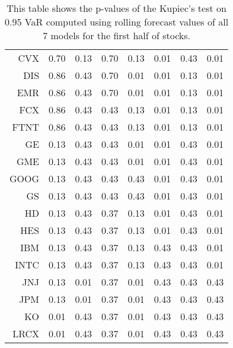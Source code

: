 \begin{table}[ht]
\begin{tabular}{rrrrrrrr}
  CVX & 0.70 & 0.13 & 0.70 & 0.13 & 0.01 & 0.43 & 0.01 \\ 
  DIS & 0.86 & 0.43 & 0.70 & 0.01 & 0.01 & 0.13 & 0.01 \\ 
  EMR & 0.86 & 0.43 & 0.70 & 0.01 & 0.01 & 0.13 & 0.01 \\ 
  FCX & 0.86 & 0.43 & 0.43 & 0.13 & 0.01 & 0.13 & 0.01 \\ 
  FTNT & 0.86 & 0.43 & 0.43 & 0.13 & 0.01 & 0.13 & 0.01 \\ 
  GE & 0.13 & 0.43 & 0.43 & 0.01 & 0.01 & 0.43 & 0.01 \\ 
  GME & 0.13 & 0.43 & 0.43 & 0.01 & 0.01 & 0.43 & 0.01 \\ 
  GOOG & 0.13 & 0.43 & 0.43 & 0.43 & 0.01 & 0.43 & 0.01 \\ 
  GS & 0.13 & 0.43 & 0.43 & 0.43 & 0.01 & 0.43 & 0.01 \\ 
  HD & 0.13 & 0.43 & 0.37 & 0.13 & 0.01 & 0.43 & 0.01 \\ 
  HES & 0.13 & 0.43 & 0.37 & 0.13 & 0.01 & 0.43 & 0.01 \\ 
  IBM & 0.13 & 0.43 & 0.37 & 0.13 & 0.43 & 0.43 & 0.01 \\ 
  INTC & 0.13 & 0.43 & 0.37 & 0.13 & 0.43 & 0.43 & 0.01 \\ 
  JNJ & 0.13 & 0.01 & 0.37 & 0.01 & 0.43 & 0.43 & 0.43 \\ 
  JPM & 0.13 & 0.01 & 0.37 & 0.01 & 0.43 & 0.43 & 0.43 \\ 
  KO & 0.01 & 0.43 & 0.37 & 0.01 & 0.43 & 0.43 & 0.43 \\ 
  LRCX & 0.01 & 0.43 & 0.37 & 0.01 & 0.43 & 0.43 & 0.43 \\ 
   \hline
\end{tabular}
\caption[Kupiec's test p-values, alpha =0.95 (1)]{This table shows the p-values of the Kupiec's test on 0.95 VaR computed using rolling forecast values of all 7 models for the first half of stocks.} 
\label{Table:Kupiec_test_rolling_0.95_1}
\end{table}
